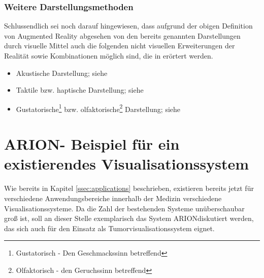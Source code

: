 \documentclass[pdftex,a4paper,titlepage,12pt]{scrartcl}
\newtheorem[L]{boxedDefinition}{Definition}
\begin{document}
\subsubsection{Weitere Darstellungsmethoden}
Schlussendlich sei noch darauf hingewiesen, dass aufgrund der obigen Definition von Augmented Reality abgesehen von den bereits genannten Darstellungen durch visuelle Mittel auch die folgenden nicht visuellen Erweiterungen der Realität sowie Kombinationen möglich sind, die in \cite[Kapitel 2.4, Seite 36-41]{Toe2010} erörtert werden. 
\begin{itemize}
 \item Akustische Darstellung; siehe \cite[Seite 37]{Toe2010}
 \item Taktile bzw. haptische Darstellung; siehe \cite[Seite 38f.]{Toe2010}
 \item Gustatorische\footnote{Gustatorisch - Den Geschmackssinn betreffend} bzw. olfaktorische\footnote{Olfaktorisch - den Geruchssinn betreffend} Darstellung; siehe \cite[Seite 39-41]{Toe2010}
\end{itemize}

\section{ARION\texttrademark - Beispiel für ein existierendes Visualisationssystem}\label{sec:arion}
Wie bereits in Kapitel \vref{ssec:applications} beschrieben, existieren bereits jetzt für verschiedene Anwendungsbereiche innerhalb der Medizin verschiedene Visualisationssysteme. Da die Zahl der bestehenden Systeme unüberschaubar groß ist, soll an dieser Stelle exemplarisch das System ARION\texttrademark diskutiert werden, das sich auch für den Einsatz als Tumorvisualisationssystem eignet.
\end{document}

